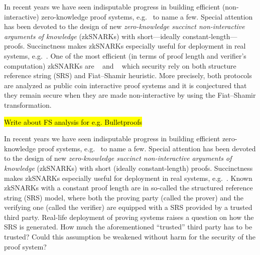 \documentclass[runningheads,11pt]{llncs}
\begin{document}
In recent years we have seen indisputable progress in building efficient
(non-interactive) zero-knowledge proof systems,
e.g.~\cite{AC:Groth10a,TCC:Lipmaa12,EC:GGPR13,SP:PHGR13,AC:Lipmaa13,AC:DFGK14,EC:Groth16,SP:BBBPWM18}
to name a few. Special attention has been devoted to the design of new
\emph{zero-knowledge succinct non-interactive arguments of knowledge} (zkSNARKs)
with short---ideally constant-length---proofs. Succinctness makes zkSNARKs
especially useful for deployment in real systems,
e.g.~\cite{REPO:Zcash20,ARXIV:RonZaj19,REPO:Zeth20,REPO:Celo20,REPO:Aztec20}. One
of the most efficient (in terms of proof length and verifier's computation)
zkSNARKs are \plonk{}~\cite{EPRINT:GabWilCio19} and \sonic{}~\cite{CCS:MBKM19}
which security rely on both structure reference string (SRS) and Fiat--Shamir
heuristic. More precisely, both protocols are analyzed as public coin
interactive proof systems and it is conjectured that they remain secure when
they are made non-interactive by using the Fiat--Shamir
transformation. 

\hl{Write about FS analysis for e.g. Bulletproofs}

In recent years we have seen indisputable progress in building efficient
zero-knowledge proof systems,
e.g.~\cite{AC:Groth10a,TCC:Lipmaa12,EC:GGPR13,SP:PHGR13,AC:Lipmaa13,AC:DFGK14,EC:Groth16,SP:BBBPWM18}
to name a few. Special attention has been devoted to the design of new
\emph{zero-knowledge succinct non-interactive arguments of knowledge} (zkSNARKs)
with short (ideally constant-length) proofs. Succinctness makes zkSNARKs
especially useful for deployment in real systems,
e.g.~\cite{REPO:Zcash20,ARXIV:RonZaj19,REPO:Zeth20,REPO:Celo20,REPO:Aztec20}. Known 
zkSNARKs with a constant proof length are in so-called the structured reference
string (SRS) model, where both the proving party (called the prover) and the
verifying one (called the verifier) are equipped with a SRS provided by a
trusted third party. Real-life deployment of proving systems raises a question
on how the SRS is generated. How much the aforementioned ``trusted'' third party
has to be trusted? Could this assumption be weakened without harm for the
security of the proof system? 
\end{document}
